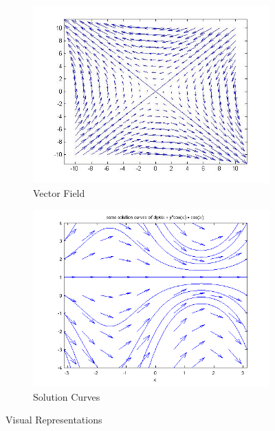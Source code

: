 \documentclass[12pt, landscape, twocolumn]{article}
\begin{document}
    \begin{figure}[ht]\label{fig:visrep}
    \centering
        \begin{subfigure}[b]{0.4\textwidth}
            \includegraphics[scale=0.25]{./img/vectorfield.png}
            \caption{Vector Field}
        \end{subfigure}
        \begin{subfigure}[b]{0.4\textwidth}
            \includegraphics[scale=0.25]{./img/solutioncurves.png}
            \caption{Solution Curves}
        \end{subfigure}
    \caption{Visual Representations}
    \end{figure}
\end{document}

